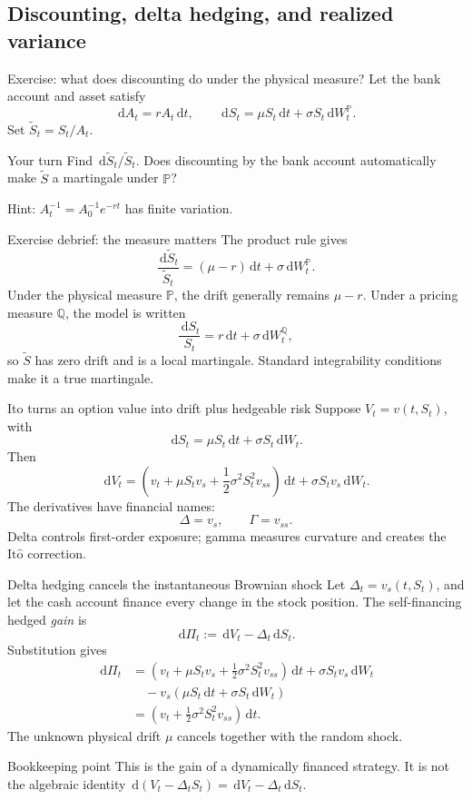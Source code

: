 \documentclass[handout,10pt,aspectratio=169]{beamer}
\newcommand{\Pp}{\mathbb P}
\newcommand{\dd}{\,\mathrm d}
\newcommand{\Ito}{\mathrm{It\hat{o}}}
\begin{document}
\subsection{Discounting, delta hedging, and realized variance}

\begin{frame}{Exercise: what does discounting do under the physical measure?}
Let the bank account and asset satisfy
\[
\dd A_t=rA_t\dd t,
\qquad
\dd S_t=\mu S_t\dd t+\sigma S_t\dd W_t^{\Pp}.
\]
Set \(\widetilde S_t=S_t/A_t\).
\begin{block}{Your turn}
Find \(\dd\widetilde S_t/\widetilde S_t\). Does discounting by the bank account automatically make \(\widetilde S\) a martingale under \(\Pp\)?
\end{block}
Hint: \(A_t^{-1}=A_0^{-1}e^{-rt}\) has finite variation.
\end{frame}

\begin{frame}{Exercise debrief: the measure matters}
The product rule gives
\[
\boxed{
\frac{\dd\widetilde S_t}{\widetilde S_t}
=(\mu-r)\dd t+\sigma\dd W_t^{\Pp}.}
\]
Under the physical measure \(\Pp\), the drift generally remains \(\mu-r\).
Under a pricing measure \(\mathbb Q\), the model is written
\[
\frac{\dd S_t}{S_t}=r\dd t+\sigma\dd W_t^{\mathbb Q},
\]
so \(\widetilde S\) has zero drift and is a local martingale. Standard integrability conditions make it a true martingale.
\end{frame}

\begin{frame}{Ito turns an option value into drift plus hedgeable risk}
Suppose \(V_t=v(t,S_t)\), with
\[
\dd S_t=\mu S_t\dd t+\sigma S_t\dd W_t.
\]
Then
\[
\boxed{
\dd V_t
=\left(v_t+\mu S_tv_s+\frac12\sigma^2S_t^2v_{ss}\right)\dd t
+\sigma S_tv_s\dd W_t.}
\]
The derivatives have financial names:
\[
\Delta=v_s,
\qquad
\Gamma=v_{ss}.
\]
Delta controls first-order exposure; gamma measures curvature and creates the \(\Ito\) correction.
\end{frame}

\begin{frame}{Delta hedging cancels the instantaneous Brownian shock}
\small
Let \(\Delta_t=v_s(t,S_t)\), and let the cash account finance every change in the stock position. The self-financing hedged \emph{gain} is
\[
\dd\Pi_t:=\dd V_t-\Delta_t\dd S_t.
\]
Substitution gives
\[
\begin{aligned}
\dd\Pi_t
&=\left(v_t+\mu S_tv_s+\frac12\sigma^2S_t^2v_{ss}\right)\dd t
+\sigma S_tv_s\dd W_t\\
&\quad-v_s\left(\mu S_t\dd t+\sigma S_t\dd W_t\right)\\
&=\boxed{\left(v_t+\frac12\sigma^2S_t^2v_{ss}\right)\dd t.}
\end{aligned}
\]
The unknown physical drift \(\mu\) cancels together with the random shock.
\begin{alertblock}{Bookkeeping point}
This is the gain of a dynamically financed strategy. It is not the algebraic identity
\(\dd(V_t-\Delta_tS_t)=\dd V_t-\Delta_t\dd S_t\).
\end{alertblock}
\end{frame}
\end{document}
